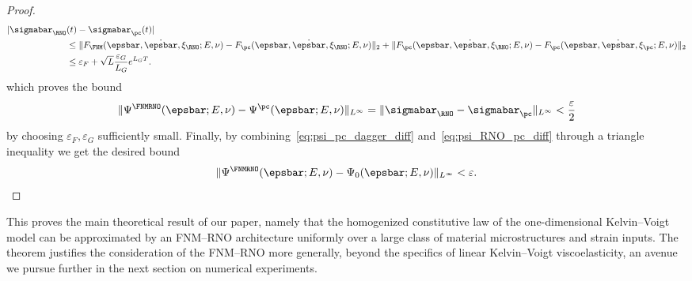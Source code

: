 \documentclass[letterpaper,11pt]{article}
\begin{document}
\begin{proof}
    \begin{align*}
        |\sigmabar_{\RNO}&(t) - \sigmabar_{\pc}(t)|\\
        &\leq \|F_{\FNM}(\epsbar, \dot{\epsbar}, \xi_{\RNO}; E, \nu) - F_{\pc}(\epsbar, \dot{\epsbar}, \xi_{\RNO}; E, \nu)\|_2 + \|F_{\pc}(\epsbar, \dot{\epsbar}, \xi_{\RNO}; E, \nu) - F_{\pc}(\epsbar, \dot{\epsbar}, \xi_{\pc}; E, \nu)\|_2\\
        &\leq \varepsilon_F + \sqrt{L}\frac{\varepsilon_G}{L_G}e^{L_GT}.
    \end{align*}
    which proves the bound
    \begin{equation}\label{eq:psi_RNO_pc_diff}
        \|\Psi^{\FNMRNO}(\epsbar; E, \nu) - \Psi^{\pc}(\epsbar; E, \nu)\|_{L^\infty} = \|\sigmabar_{\RNO} - \sigmabar_{\pc}\|_{L^\infty} < \frac{\varepsilon}{2}
    \end{equation}
    by choosing $\varepsilon_F, \varepsilon_G$ sufficiently small. Finally, by combining~\eqref{eq:psi_pc_dagger_diff} and~\eqref{eq:psi_RNO_pc_diff} through a triangle inequality we get the desired bound
    \begin{equation}
        \|\Psi^{\FNMRNO}(\epsbar; E, \nu) - \Psi_0(\epsbar; E, \nu)\|_{L^\infty} < \varepsilon.
    \end{equation}
\end{proof}
This proves the main theoretical result of our paper, namely that the homogenized constitutive law of the one-dimensional Kelvin--Voigt model can be approximated by an FNM--RNO architecture uniformly over a large class of material microstructures and strain inputs. The theorem justifies the consideration of the FNM--RNO more generally, beyond the specifics of linear Kelvin--Voigt viscoelasticity, an avenue we pursue further in the next section on numerical experiments.
\end{document}

